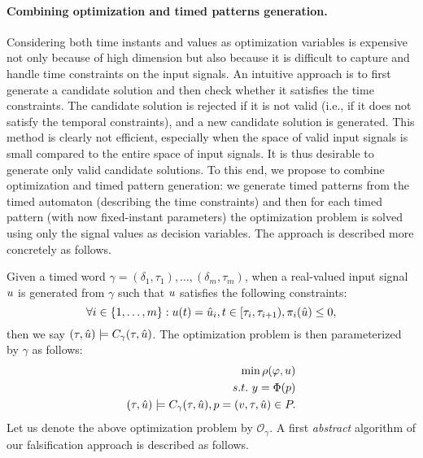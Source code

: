 
\paragraph{Combining optimization and timed patterns generation.} Considering  both time instants and values as optimization variables is expensive not only because of high dimension but also because it is difficult to capture and handle time constraints on the input signals. An intuitive approach is to first generate a candidate solution and then check whether it satisfies the time constraints. The candidate solution is rejected if it is not valid (i.e., if it does not satisfy the temporal constraints), and a new candidate solution is generated. This method is clearly not efficient, especially when the space of valid input signals is small compared to the entire space of input signals. It is thus desirable to generate only valid candidate solutions. To this end, we propose to combine optimization and timed pattern generation: we generate timed patterns from the timed automaton (describing the time constraints) and then for each timed pattern (with now fixed-instant parameters) the optimization problem is solved using only the signal values as decision variables. The approach is described more concretely as follows.

Given a timed word $\gamma = (\delta_1, \tau_1), \ldots, (\delta_m, \tau_m)$, when a real-valued input signal $u$ is generated from $\gamma$ such that $u$ satisfies the following constraints:
$$\forall i \in \{1, \ldots, m \}: u (t)= \hat{u}_i, t \in [\tau_i, \tau_{i+1}), \pi_i(\hat{u})  \le 0,$$
then we say $(\tau, \hat{u}) \models C_{\gamma}(\tau, \hat{u})$. The optimization problem is then parameterized by $\gamma$ as follows:
\begin{eqnarray} \label{eq:optim2}
\min \rho(\varphi, u) \\ \nonumber
s.t. ~y=\Phi(p) \\ \nonumber
(\tau, \hat{u}) \models C_{\gamma}(\tau, \hat{u}), p = (v, \tau, \hat{u}) \in P . \nonumber
\end{eqnarray}
Let us denote the above optimization problem by $\mathcal{O}_{\gamma}$. A first {\em abstract} algorithm of our falsification approach is described as follows.


